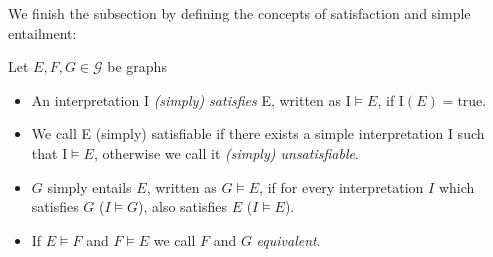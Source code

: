 

We finish the subsection by defining the concepts of satisfaction and simple entailment:
\begin{definition}
Let $E,F,G\in \mathcal{G}$ be \rdf graphs
\begin{itemize}
\item An interpretation  $\mathrm{I}$ \emph{(simply) satisfies} E, written as $\mathrm{I}\models E$, if $\mathrm{I}(E)=\text{true}$.
\item We call E (simply) satisfiable if there exists a simple interpretation $\mathrm{I}$ such that $\mathrm{I}\models E$, otherwise we call it \emph{(simply) unsatisfiable}.
\item $G$ simply entails $E$, written as $G\models E$, if for every interpretation $I$ which satisfies $G$ ($I\models G$), also satisfies $E$ ($I\models E$). 
\item If $E\models F$ and $F\models E$ we call $F$ and $G$ \emph{equivalent}.
\end{itemize}
\end{definition}
% 
% 
% 
% 
% 
% 
% 
